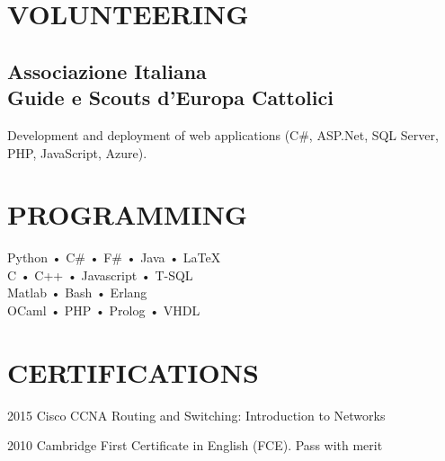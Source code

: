 \documentclass[a4paper]{deedy-resume-openfont}
\begin{document}
\begin{minipage}[t]{0.3\textwidth}
\section{VOLUNTEERING}

\subsection{Associazione Italiana\\ Guide e Scouts d'Europa Cattolici}
\vspace{\topsep} %
Development and deployment of web applications
(C\#, ASP.Net, SQL Server, PHP, JavaScript, Azure).
\sectionsep%

\section{PROGRAMMING}
Python • C\# • F\# • Java • \LaTeX{}\\
C • C++ • Javascript • T-SQL\\ Matlab • Bash • Erlang \\
OCaml • PHP • Prolog • VHDL
\sectionsep%

\section{CERTIFICATIONS} 
\vspace{\topsep} %
\begin{tightemize}
\item[2015]    Cisco CCNA Routing and Switching: Introduction to Networks\\
\item[2010]    Cambridge First Certificate in English (FCE). Pass with merit\\
\end{tightemize}
\sectionsep%

\end{minipage} 
\hfill
\end{document}

